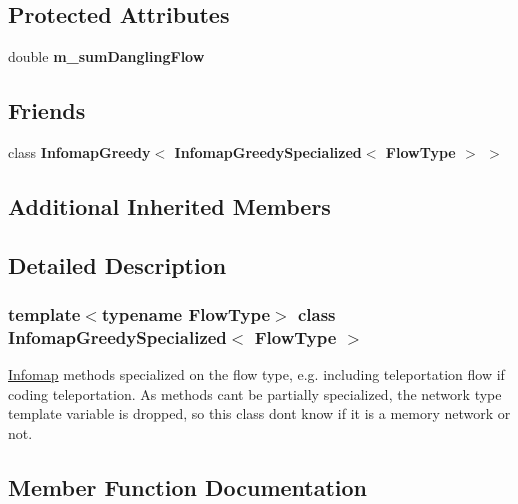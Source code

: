 \subsection*{Protected Attributes}
\begin{DoxyCompactItemize}
\item 
\mbox{\label{classInfomapGreedySpecialized_a0e21c84a547706c86a2049db1a5e3c89}} 
double {\bfseries m\+\_\+sum\+Dangling\+Flow}
\end{DoxyCompactItemize}
\subsection*{Friends}
\begin{DoxyCompactItemize}
\item 
\mbox{\label{classInfomapGreedySpecialized_ae3c8517ca2d36b0f5cceac8cda634d0e}} 
class {\bfseries Infomap\+Greedy$<$ Infomap\+Greedy\+Specialized$<$ Flow\+Type $>$ $>$}
\end{DoxyCompactItemize}
\subsection*{Additional Inherited Members}


\subsection{Detailed Description}
\subsubsection*{template$<$typename Flow\+Type$>$\newline
class Infomap\+Greedy\+Specialized$<$ Flow\+Type $>$}

\mbox{\hyperlink{classInfomap}{Infomap}} methods specialized on the flow type, e.\+g. including teleportation flow if coding teleportation. As methods can\textquotesingle{}t be partially specialized, the network type template variable is dropped, so this class don\textquotesingle{}t know if it is a memory network or not. 

\subsection{Member Function Documentation}
\mbox{\label{classInfomapGreedySpecialized_ab1ccbef79b7e94cf2762aa5a94a28965}} 
